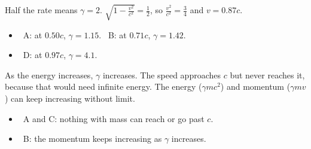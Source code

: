 \documentclass[12pt]{article}
\begin{document}
\begin{practiceanswers}
\begin{practiceans}
  Half the rate means $\gamma = 2$. $\sqrt{1 - \frac{v^2}{c^2}} = \frac{1}{2}$, so $\frac{v^2}{c^2} = \frac{3}{4}$
  and $v = 0.87c$.
  \begin{itemize}
    \item \xmark\ A: at $0.50c$, $\gamma = 1.15$. \quad \xmark\ B: at $0.71c$, $\gamma = 1.42$.
    \item \xmark\ D: at $0.97c$, $\gamma = 4.1$.
  \end{itemize}
\end{practiceans}

\begin{practiceans}
  As the energy increases, $\gamma$ increases. The speed approaches $c$ but never reaches it, because
  that would need infinite energy. The energy ($\gamma mc^2$) and momentum ($\gamma mv$) can keep
  increasing without limit.
  \begin{itemize}
    \item \xmark\ A and C: nothing with mass can reach or go past $c$.
    \item \xmark\ B: the momentum keeps increasing as $\gamma$ increases.
  \end{itemize}
\end{practiceans}

\end{practiceanswers}
\end{document}
